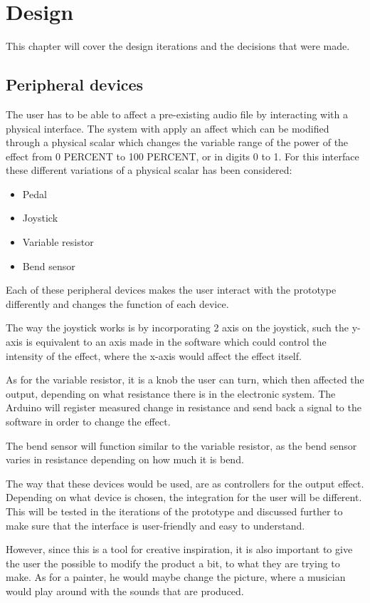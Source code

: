 \chapter{Design}\label{ch:design}
This chapter will cover the design iterations and the decisions that were made. 


\section{Peripheral devices}
The user has to be able to affect a pre-existing audio file by interacting with a physical interface. The system with apply an affect which can be modified through a physical scalar which changes the variable range of the power of the effect from 0 PERCENT to 100 PERCENT, or in digits 0 to 1. For this interface these different variations of a physical scalar has been considered: 

\begin{itemize}
\item Pedal
\item Joystick
\item Variable resistor
\item Bend sensor
\end{itemize}



Each of these peripheral devices makes the user interact with the prototype differently and changes the function of each device. 

The way the joystick works is by incorporating 2 axis on the joystick, such the y-axis is equivalent to an axis made in the software which could control the intensity of the effect, 
where the x-axis would affect the effect itself. 

As for the variable resistor, it is a knob the user can turn, which then affected the output, depending on what resistance there is in the electronic system. The Arduino will register measured change in resistance and send back a signal to the software in order to change the effect.

The bend sensor will function similar to the variable resistor, as the bend sensor varies in resistance depending on how much it is bend.

The way that these devices would be used, are as controllers for the output effect. Depending on what device is chosen, the integration for the user will be different. This will be tested in the iterations of the prototype and discussed further to make sure that the interface is user-friendly and easy to understand. 

However, since this is a tool for creative inspiration, it is also important to give the user the possible to modify the product a bit, to what they are trying to make. As for a painter, he would maybe change the picture, where a musician would play around with the sounds that are produced. 